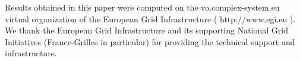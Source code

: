 \documentclass[alpha-refs]{wiley-article}
\begin{document}
Results obtained in this paper were computed on the vo.complex-system.eu virtual organization of the European Grid Infrastructure ( http://www.egi.eu ). We thank the European Grid Infrastructure and its supporting National Grid Initiatives (France-Grilles in particular) for providing the technical support and infrastructure.












\end{document}
